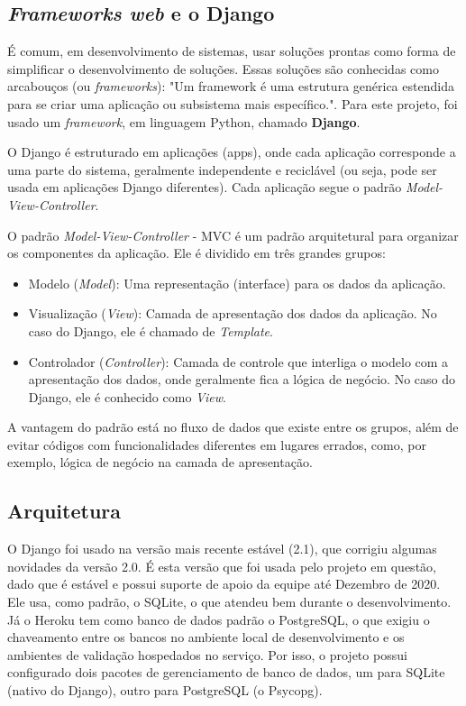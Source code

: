 \subsection{\textit{Frameworks web} e o Django}
É comum, em desenvolvimento de sistemas, usar soluções prontas como forma de simplificar o desenvolvimento de soluções. Essas soluções são conhecidas como arcabouços (ou \textit{frameworks})\cite{iansommerville2011}: "Um framework é uma estrutura genérica estendida para se criar uma aplicação ou subsistema mais específico.". Para este projeto, foi usado um \textit{framework}, em linguagem Python, chamado \textbf{Django}.

O Django é estruturado em aplicações (apps), onde cada aplicação corresponde a uma parte do sistema, geralmente independente e reciclável (ou seja, pode ser usada em aplicações Django diferentes). Cada aplicação segue o padrão \textit{Model-View-Controller}.

O padrão \textit{Model-View-Controller} - MVC é um padrão arquitetural para organizar os componentes da aplicação. Ele é dividido em três grandes grupos\cite{thedjangobook2018}:

\begin{itemize}
    \item Modelo (\textit{Model}): Uma representação (interface) para os dados da aplicação.
    \item Visualização (\textit{View}): Camada de apresentação dos dados da aplicação. No caso do Django, ele é chamado de \textit{Template}.
    \item Controlador (\textit{Controller}): Camada de controle que interliga o modelo com a apresentação dos dados, onde geralmente fica a lógica de negócio. No caso do Django, ele é conhecido como \textit{View}.
\end{itemize}

A vantagem do padrão está no fluxo de dados que existe entre os grupos, além de evitar códigos com funcionalidades diferentes em lugares errados, como, por exemplo, lógica de negócio na camada de apresentação.

\subsection{Arquitetura}
O Django foi usado na versão mais recente estável (2.1), que corrigiu algumas novidades da versão 2.0. É esta versão que foi usada pelo projeto em questão, dado que é estável e possui suporte de apoio da equipe até Dezembro de 2020\cite{djangodownload}. Ele usa, como padrão, o SQLite, o que atendeu bem durante o desenvolvimento. Já o Heroku tem como banco de dados padrão o PostgreSQL, o que exigiu o chaveamento entre os bancos no ambiente local de desenvolvimento e os ambientes de validação hospedados no serviço. Por isso, o projeto possui configurado dois pacotes de gerenciamento de banco de dados, um para SQLite (nativo do Django), outro para PostgreSQL (o Psycopg\cite{lucassouto2017}).

